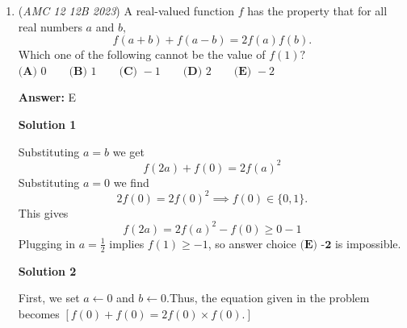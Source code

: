 \begin{enumerate}
 By using the numbers given in this problem, the height of the cone is $6 \sqrt{3}$.Thus, $OA = 12$ and $OB = 6$.

 We unfold the lateral face. So we get a circular sector.The radius is 12 and the length of the arc is $12\pi$.Thus, the central angle of this circular sector is $180^\circ$.

 Because $A$ and $B$ are opposite in the original frustum, in the unfolded circular cone, $\angle AOB = \frac{180^\circ}{2} = 90^\circ$.

 Notice that a feasible path between $A$ and $B$ can only fall into the region with the range of radii between $OB = 6$ and $OA = 12$.Therefore, we cannot directly connect $A$ and $B$ and must make a detour.Denote by $AC$ a tangent to the circular sector with radius 6 that meets it at point $C$.Therefore, the shortest path between $A$ and $B$ consists of a segment $AC$ and an arc from $C$ to $B$.

 Because $OA = 12$, $OC = 6$ and $\angle OCA = 90^\circ$, we have $AC = \sqrt{OA^2 - OC^2} = 6 \sqrt{3}$ and $\angle AOC = 60^\circ$.This implies $\angle COB = \angle AOB - \angle AOC = 30^\circ$.Therefore, the length of the arc between $C$ and $B$ is $OB \cdot \pi \cdot  \frac{\angle COB}{180^\circ} = \pi$.Therefore, the shortest distance between $A$ and $B$ is $\boxed{\textbf{(E) } 6 \sqrt{3} + \pi}$.

 


	\item (\textit{AMC 12 12B 2023}) A real-valued function $f$ has the property that for all real numbers $a$ and $b,$
 \[f(a + b)  + f(a - b) = 2f(a) f(b).\]Which one of the following cannot be the value of $f(1)?$
$\textbf{(A) } 0 \qquad \textbf{(B) } 1 \qquad \textbf{(C) } -1 \qquad \textbf{(D) } 2 \qquad \textbf{(E) } -2$

 \textbf{Answer: }E



\textbf{Solution 1}

Substituting $a = b$ we get 
 \[f(2a) + f(0) = 2f(a)^2\]Substituting $a= 0$ we find 
 \[2f(0) = 2f(0)^2 \implies f(0) \in \{0, 1\}.\]This gives 
 \[f(2a) = 2f(a)^2 - f(0) \geq 0-1\]Plugging in $a = \frac{1}{2}$ implies $f(1) \geq -1$, so answer choice $\boxed{\textbf{(E) -2}}$ is impossible. 

 



\textbf{Solution 2}

First, we set $a \leftarrow 0$ and $b \leftarrow 0$.Thus, the equation given in the problem becomes $[ f(0) + f(0) = 2 f(0) \times f(0) . ]$


\end{enumerate}
